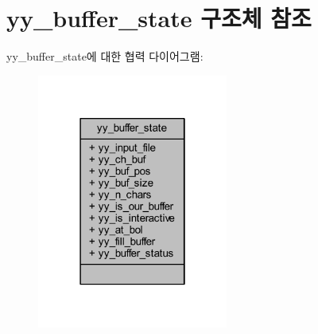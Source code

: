 \hypertarget{structyy__buffer__state}{}\section{yy\+\_\+buffer\+\_\+state 구조체 참조}
\label{structyy__buffer__state}


yy\+\_\+buffer\+\_\+state에 대한 협력 다이어그램\+:\nopagebreak
\begin{figure}[H]
\begin{center}
\leavevmode
\includegraphics[width=178pt]{structyy__buffer__state__coll__graph}
\end{center}
\end{figure}
